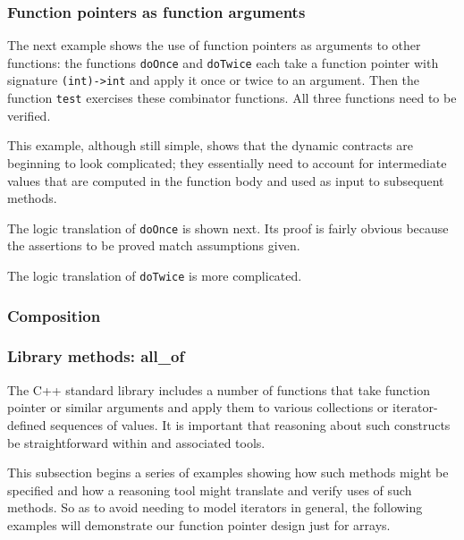 \subsubsection{Function pointers as function arguments}
The next example shows the use of function pointers as arguments to other functions: the functions \lstinline|doOnce|
and \lstinline|doTwice| each take a function pointer with signature \lstinline|(int)->int| and apply it once or twice to an
argument. Then the function \lstinline|test| exercises these combinator functions. All three functions need to be verified.



This example, although still simple, shows that the dynamic contracts
are beginning to look complicated; they essentially need to account
for intermediate values that are computed in the function body and used as input to subsequent methods.



The logic translation of \lstinline|doOnce| is shown next. Its proof is fairly obvious because the assertions to be proved match
assumptions given.



The logic translation of \lstinline|doTwice| is more complicated.




\subsubsection{Composition}

\TODO{}

\subsubsection{Library methods: all\_of}
\label{sec:libraryMethods}
The C++ standard library includes a number of functions that take function pointer or similar arguments and apply them to various
collections or iterator-defined sequences of values.
It is important
that reasoning about such constructs be straightforward within \NAME and
associated tools.

This subsection begins a series of examples showing how such methods might be
specified and how a reasoning tool might translate and verify uses of such methods. So as to avoid needing to model iterators in general, the
following examples will demonstrate our function pointer design just
for arrays.

